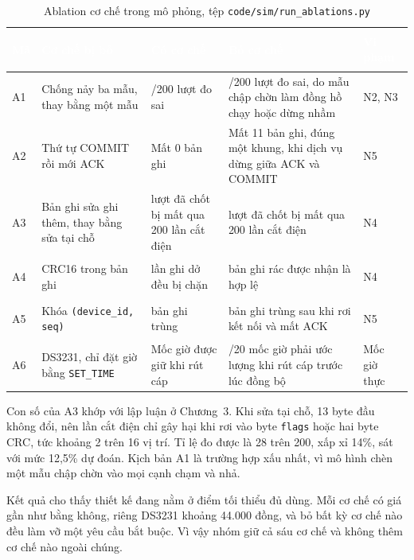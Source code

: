 \begin{table}[H]
    \centering
    \small
    \renewcommand{\arraystretch}{1.35}
    \caption{Ablation cơ chế trong mô phỏng, tệp \texttt{code/sim/run\_ablations.py}}
    \label{tab:sim-ablation}
    \begin{tabular}{>{\bfseries\raggedright\arraybackslash}m{0.6cm} >{\raggedright\arraybackslash}m{3.6cm} >{\raggedright\arraybackslash}m{2.9cm} >{\raggedright\arraybackslash}m{4.4cm} >{\raggedright\arraybackslash}m{1.6cm}}
        \toprule
        \rowcolor{haitayblue}
        \textcolor{white}{Mã} & \textcolor{white}{Cơ chế bị bỏ} & \textcolor{white}{Có cơ chế} & \textcolor{white}{Bỏ cơ chế} & \textcolor{white}{Vi phạm} \\
        \midrule
        \rowcolor{haitayblue!8}
        A1 & Chống nảy ba mẫu, thay bằng một mẫu & 0/200 lượt đo sai & 198/200 lượt đo sai, do mẫu chập chờn làm đồng hồ chạy hoặc dừng nhầm & N2, N3 \\
        A2 & Thứ tự COMMIT rồi mới ACK & Mất 0 bản ghi & Mất 11 bản ghi, đúng một khung, khi dịch vụ dừng giữa ACK và COMMIT & N5 \\
        \rowcolor{haitayblue!8}
        A3 & Bản ghi sửa ghi thêm, thay bằng sửa tại chỗ & 0 lượt đã chốt bị mất qua 200 lần cắt điện & 28 lượt đã chốt bị mất qua 200 lần cắt điện & N4 \\
        A4 & CRC16 trong bản ghi & 184 lần ghi dở đều bị chặn & 184 bản ghi rác được nhận là hợp lệ & N4 \\
        \rowcolor{haitayblue!8}
        A5 & Khóa \texttt{(device\_id, seq)} & 0 bản ghi trùng & 11 bản ghi trùng sau khi rơi kết nối và mất ACK & N5 \\
        A6 & DS3231, chỉ đặt giờ bằng \texttt{SET\_TIME} & Mốc giờ được giữ khi rút cáp & 20/20 mốc giờ phải ước lượng khi rút cáp trước lúc đồng bộ & Mốc giờ thực \\
        \bottomrule
    \end{tabular}
\end{table}

Con số của A3 khớp với lập luận ở Chương~3. Khi sửa tại chỗ, 13 byte đầu không đổi, nên lần cắt điện chỉ gây hại khi rơi vào byte \texttt{flags} hoặc hai byte CRC, tức khoảng 2 trên 16 vị trí. Tỉ lệ đo được là 28 trên 200, xấp xỉ 14\%, sát với mức 12,5\% dự đoán. Kịch bản A1 là trường hợp xấu nhất, vì mô hình chèn một mẫu chập chờn vào mọi cạnh chạm và nhả.

Kết quả cho thấy thiết kế đang nằm ở điểm tối thiểu đủ dùng. Mỗi cơ chế có giá gần như bằng không, riêng DS3231 khoảng 44.000 đồng, và bỏ bất kỳ cơ chế nào đều làm vỡ một yêu cầu bắt buộc. Vì vậy nhóm giữ cả sáu cơ chế và không thêm cơ chế nào ngoài chúng.

